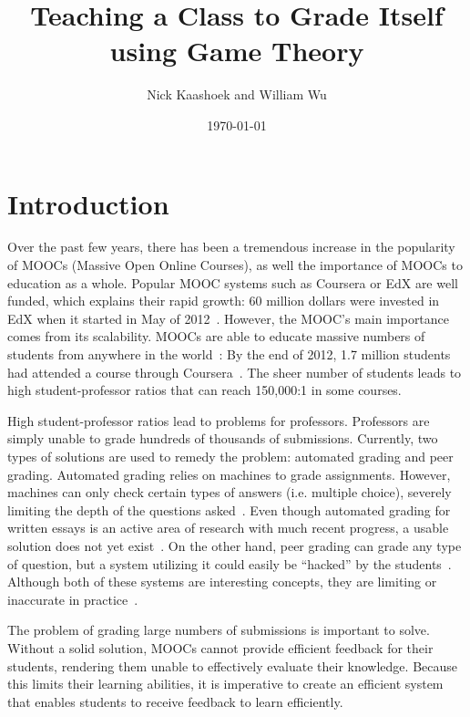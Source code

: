 \documentclass[12pt, Arial]{article}
\title{Teaching a Class to Grade Itself using Game Theory}
\author{Nick Kaashoek and William Wu}
\date{\today}
\begin{document}
\maketitle
\section{Introduction}
Over the past few years, there has been a tremendous increase in the popularity of MOOCs (Massive Open Online Courses), as well the importance of MOOCs to education as a whole. Popular MOOC systems such as Coursera or EdX are well funded, which explains their rapid growth: 60 million dollars were invested in EdX when it started in May of 2012~\cite{canmoocsreducecc}. However, the MOOC's main importance comes from its scalability. MOOCs are able to educate massive numbers of students from anywhere in the world~\cite{makingsenseofmoocs}: By the end of 2012, 1.7 million students had attended a course through Coursera~\cite{swotanalysisofmoocs}. The sheer number of students leads to high student-professor ratios that can reach 150,000:1 in some courses.

High student-professor ratios lead to problems for professors. Professors are simply unable to grade hundreds of thousands of submissions. Currently, two types of solutions are used to remedy the problem: automated grading and peer grading. Automated grading relies on machines to grade assignments. However, machines can only check certain types of answers (i.e. multiple choice), severely limiting the depth of the questions asked~\cite{rightandwrongmoocs}. Even though automated grading for written essays is an active area of research with much recent progress, a usable solution does not yet exist~\cite{automatedsystemssuck}. On the other hand, peer grading can grade any type of question, but a system utilizing it could easily be ``hacked'' by the students~\cite{makingsenseofmoocs}. Although both of these systems are interesting concepts, they are limiting or inaccurate in practice~\cite{howaccurateispeergrading}.

The problem of grading large numbers of submissions is important to solve. Without a solid solution, MOOCs cannot provide efficient feedback for their students, rendering them unable to effectively evaluate their knowledge. Because this limits their learning abilities, it is imperative to create an efficient system that enables students to receive feedback to learn efficiently.
\end{document}
